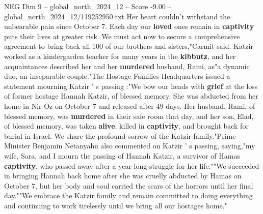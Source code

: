 \begin{textsample}{NEG Dim 9 – global\_north\_2024\_12 – Score -9.00 – global\_north\_2024\_12/119252950.txt}
Her heart couldn't withstand the unbearable pain since October 7.
Each day our \textbf{loved} ones remain in \textbf{captivity} puts their lives at greater risk.
We must act now to secure a comprehensive agreement to bring back all 100 of our brothers and sisters,"Carmit said.
Katzir worked as a kindergarden teacher for many years in the \textbf{kibbutz}, and her acquaintances described her and her \textbf{murdered} husband, Rami, as"a dynamic duo, an inseparable couple."The Hostage Families Headquarters issued a statement mourning Katzir ' s passing :"We bow our heads with \textbf{grief} at the loss of former hostage Hannah Katzir, of blessed memory.
She was abducted from her home in Nir Oz on October 7 and released after 49 days.
Her husband, Rami, of blessed memory, was \textbf{murdered} in their safe room that day, and her son, Elad, of blessed memory, was taken \textbf{alive}, killed in \textbf{captivity}, and brought back for burial in Israel.
We share the profound sorrow of the Katzir family."Prime Minister Benjamin Netanyahu also commented on Katzir ' s passing, saying,"my wife, Sara, and I mourn the passing of Hannah Katzir, a survivor of Hamas \textbf{captivity}, who passed away after a year-long struggle for her life.""We succeeded in bringing Hannah back home after she was cruelly abducted by Hamas on October 7, but her body and soul carried the scars of the horrors until her final day.""We embrace the Katzir family and remain committed to doing everything and continuing to work tirelessly until we bring all our hostages home."

\end{textsample}
